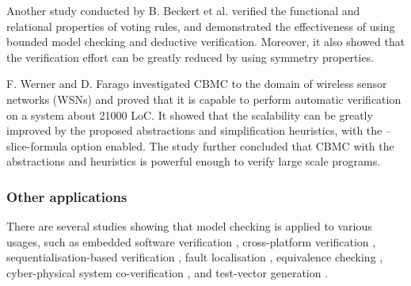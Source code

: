 Another study conducted by B. Beckert et al. \cite{beckertBormerKirsten2016} verified the functional and relational properties of voting rules, and demonstrated the effectiveness of using bounded model checking and deductive verification. Moreover, it also showed that the verification effort can be greatly reduced by using symmetry properties. 

F. Werner and D. Farago \cite{Werner2010CorrectnessOS} investigated CBMC to the domain of wireless sensor networks (WSNs) and proved that it is capable to perform automatic verification on a system about 21000 LoC. It showed that the scalability can be greatly improved by the proposed abstractions and simplification heuristics, with the --slice-formula option enabled. The study further concluded that CBMC with the abstractions and heuristics is powerful enough to verify large scale programs. 

\subsubsection{Other applications}
There are several studies showing that model checking is applied to various usages, such as embedded software verification \cite{Cordeiro:2009:SBM:1747491.1747515, BK11}, cross-platform verification \cite{0fbeb641779543c98fb1d6ff2180664c}, sequentialisation-based verification \cite{6693139}, fault localisation \cite{Griesmayer:2007:AFL:1247747.1248089}, equivalence checking \cite{Lee2011}, cyber-physical system co-verification \cite{6649878}, and test-vector generation \cite{Angeletti2009}.









